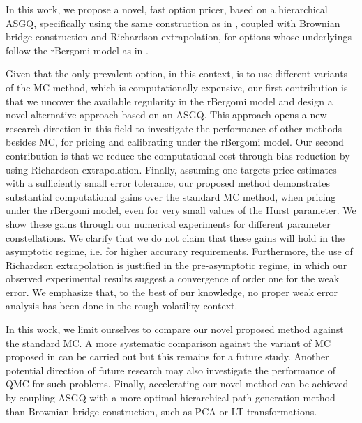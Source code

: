 In this work,  we propose a novel, fast option pricer,  based on a  hierarchical ASGQ, specifically using the same construction as in \cite{haji2016multi}, coupled with Brownian bridge construction and Richardson extrapolation, for options whose underlyings  follow the rBergomi model as in \cite{bayer2016pricing}. 

Given that the only prevalent option, in this context, is to use different variants of the MC method, which is computationally expensive, our first contribution  is that we uncover the available regularity in the rBergomi model and  design a novel alternative approach based on an ASGQ. This approach  opens a new research direction in this field to investigate the performance of other methods besides MC, for pricing and calibrating under the rBergomi model. Our second contribution is that we reduce the computational cost  through bias reduction by using Richardson extrapolation. Finally, assuming one targets price estimates with a sufficiently small error tolerance, our proposed method demonstrates substantial computational gains  over the standard MC method, when pricing under the rBergomi model, even for very small values of the Hurst parameter. We show  these gains through our numerical experiments for  different parameter constellations.  We clarify that we do not claim that these gains will hold in the asymptotic regime, i.e.  for higher accuracy requirements. Furthermore, the use of Richardson extrapolation is justified in the pre-asymptotic regime, in which our observed experimental results suggest a convergence of order one for the weak error. We emphasize that, to the best of our knowledge, no proper weak error analysis has been done in the rough volatility context. 

In this work, we limit ourselves to compare our novel proposed method against the standard MC. A more systematic comparison against the variant of MC proposed in \cite{mccrickerd2018turbocharging}  can be carried out but this remains for a future study. Another  potential direction of future  research may also investigate the performance of QMC for such problems. Finally, accelerating  our novel  method can be achieved  by coupling ASGQ with a more optimal hierarchical path generation method than Brownian bridge construction, such as PCA or LT transformations.